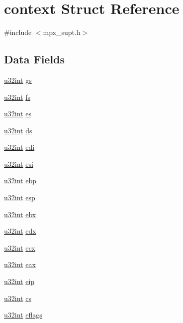 \hypertarget{structcontext}{}\section{context Struct Reference}
\label{structcontext}


{\ttfamily \#include $<$mpx\+\_\+supt.\+h$>$}

\subsection*{Data Fields}
\begin{DoxyCompactItemize}
\item 
\hyperlink{system_8h_a757de76cafbcddaac0d1632902fe4cb8}{u32int} \hyperlink{structcontext_abcc56997e8024ea8d5d3cf7e1ef6ae3a}{gs}
\item 
\hyperlink{system_8h_a757de76cafbcddaac0d1632902fe4cb8}{u32int} \hyperlink{structcontext_a59556586c5fc48990f50150d95a0735d}{fs}
\item 
\hyperlink{system_8h_a757de76cafbcddaac0d1632902fe4cb8}{u32int} \hyperlink{structcontext_aa9186bcc7f073d849fd12d4f2c649637}{es}
\item 
\hyperlink{system_8h_a757de76cafbcddaac0d1632902fe4cb8}{u32int} \hyperlink{structcontext_a27b615cc9d414c57f335c1744908fbd1}{ds}
\item 
\hyperlink{system_8h_a757de76cafbcddaac0d1632902fe4cb8}{u32int} \hyperlink{structcontext_ab42cc86f60a286d9cb20116b853239ff}{edi}
\item 
\hyperlink{system_8h_a757de76cafbcddaac0d1632902fe4cb8}{u32int} \hyperlink{structcontext_a031d176a324992b1ef7c3b7335383590}{esi}
\item 
\hyperlink{system_8h_a757de76cafbcddaac0d1632902fe4cb8}{u32int} \hyperlink{structcontext_a98b65807686fee47d4061d2f2ea8578a}{ebp}
\item 
\hyperlink{system_8h_a757de76cafbcddaac0d1632902fe4cb8}{u32int} \hyperlink{structcontext_a7c8cdb0e23278dc958565ee9a5ebb14b}{esp}
\item 
\hyperlink{system_8h_a757de76cafbcddaac0d1632902fe4cb8}{u32int} \hyperlink{structcontext_aab632bcfbdfeee937cc42940432af39a}{ebx}
\item 
\hyperlink{system_8h_a757de76cafbcddaac0d1632902fe4cb8}{u32int} \hyperlink{structcontext_aeef91c926bff500767180c01b413a537}{edx}
\item 
\hyperlink{system_8h_a757de76cafbcddaac0d1632902fe4cb8}{u32int} \hyperlink{structcontext_aab67c5aaaf6afb6a2c47a4c81fb0d567}{ecx}
\item 
\hyperlink{system_8h_a757de76cafbcddaac0d1632902fe4cb8}{u32int} \hyperlink{structcontext_aa4608f9844ee6e6e638c487a8c8aa14f}{eax}
\item 
\hyperlink{system_8h_a757de76cafbcddaac0d1632902fe4cb8}{u32int} \hyperlink{structcontext_ac6586230a521f5a60cded255700eaa79}{eip}
\item 
\hyperlink{system_8h_a757de76cafbcddaac0d1632902fe4cb8}{u32int} \hyperlink{structcontext_aff16eb39266599b77ad4025e1cf36c4e}{cs}
\item 
\hyperlink{system_8h_a757de76cafbcddaac0d1632902fe4cb8}{u32int} \hyperlink{structcontext_a1d2e9eee9e5db4c3658f2d72065463f3}{eflags}
\end{DoxyCompactItemize}


